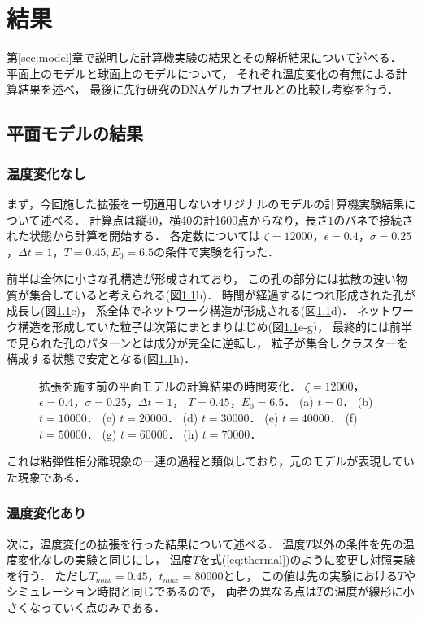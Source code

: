 \chapter{結果}
\label{sec:result}

第\ref{sec:model}章で説明した計算機実験の結果とその解析結果について述べる．
平面上のモデルと球面上のモデルについて，
それぞれ温度変化の有無による計算結果を述べ，
最後に先行研究のDNAゲルカプセルとの比較し考察を行う．


\section{平面モデルの結果}


\subsection{温度変化なし}
まず，今回施した拡張を一切適用しないオリジナルのモデルの計算機実験結果について述べる．
計算点は縦40，横40の計1600点からなり，長さ$1$のバネで接続された状態から計算を開始する．
各定数については
$\zeta=12000$，$\epsilon=0.4$，$\sigma=0.25$，$\Delta t=1$，$T=0.45, E_0=6.5$の条件で実験を行った．

前半は全体に小さな孔構造が形成されており，
この孔の部分には拡散の速い物質が集合していると考えられる(図\ref{fig:result_2d_without_anearing}b)．
時間が経過するにつれ形成された孔が成長し(図\ref{fig:result_2d_without_anearing}c)，
系全体でネットワーク構造が形成される(図\ref{fig:result_2d_without_anearing}d)．
ネットワーク構造を形成していた粒子は次第にまとまりはじめ(図\ref{fig:result_2d_without_anearing}e-g)，
最終的には前半で見られた孔のパターンとは成分が完全に逆転し，
粒子が集合しクラスターを構成する状態で安定となる(図\ref{fig:result_2d_without_anearing}h)．
\begin{figure}
    \centering
    
    \caption{
        拡張を施す前の平面モデルの計算結果の時間変化．
        $\zeta=12000$，$\epsilon=0.4$，$\sigma=0.25$，$\Delta t=1$，
        $T=0.45$，$E_0=6.5$．
        (a) $t=0$．
        (b) $t=10000$．
        (c) $t=20000$．
        (d) $t=30000$．
        (e) $t=40000$．
        (f) $t=50000$．
        (g) $t=60000$．
        (h) $t=70000$．
    }
    \label{fig:result_2d_without_anearing}
\end{figure}
これは粘弾性相分離現象の一連の過程と類似しており，元のモデルが表現していた現象である．


\subsection{温度変化あり}
次に，温度変化の拡張を行った結果について述べる．
温度$T$以外の条件を先の温度変化なしの実験と同じにし，
温度$T$を式(\ref{eq:thermal})のように変更し対照実験を行う．
ただし$T_{max}=0.45$，$t_{max}=80000$とし，
この値は先の実験における$T$やシミュレーション時間と同じであるので，
両者の異なる点は$T$の温度が線形に小さくなっていく点のみである．

